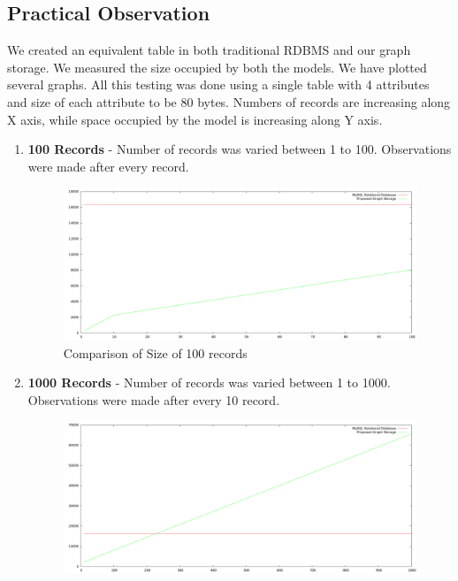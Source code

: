 \documentclass[12pt, oneside]{book}
\begin{document}
\subsection{Practical Observation}
We created an equivalent table in both traditional RDBMS and our graph storage. We measured the size occupied by both the models. We have plotted several graphs. All this testing was done using a single table with 4 attributes and size of each attribute to be 80 bytes. Numbers of records are increasing along X axis, while space occupied by the model is increasing along Y axis.
\begin{enumerate}
 \item \textbf{100 Records} - Number of records was varied between 1 to 100. Observations were made after every record.
 \begin{figure}[H]
  \begin{center}
   \includegraphics[width=\textwidth]{pics/100.png}
   \caption{Comparison of Size of 100 records}
   \label{100pic}
  \end{center}
 \end{figure}
\item \textbf{1000 Records} - Number of records was varied between 1 to 1000. Observations were made after every 10 record.
 \begin{figure}[H]
  \begin{center}
   \includegraphics[width=\textwidth]{pics/1000.png}

\end{center}
\end{figure}
\end{enumerate}
\end{document}
